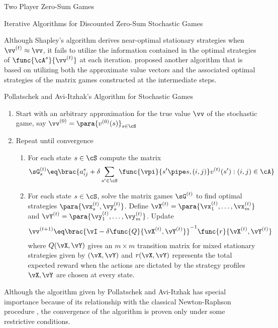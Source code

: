 \documentclass{article}
\begin{document}
\begin{psection}{Two Player Zero-Sum Games}
\begin{psubsection}{Iterative Algorithms for Discounted Zero-Sum Stochastic Games}

		Although Shapley's algorithm derives near-optimal stationary strategies when $\vv^{(t)} \approx \vv$, it fails to utilize the information contained in the optimal strategies of $\func{\cA^s}{\vv^{(t)}}$ at each iteration. \cite{poll-avi} proposed another algorithm that is based on utilizing both the approximate value vectors and the associated optimal strategies of the matrix games constructed at the intermediate steps.

		\begin{algo}[0.9\textwidth]{Pollatschek and Avi-Itzhak's Algorithm for Stochastic Games}
			\begin{enumerate}
				\item Start with an arbitrary approximation for the true value $\vv$ of the stochastic game, say $\vv^{(0)} = \para{v^{(0)}(s)}_{s \in \cS}$
				\item Repeat until convergence
					\begin{enumerate}
						\item For each state $s \in \cS$ compute the matrix
							\begin{align*}
								\sG_s^{(t)} \eq \brac{a^s_{ij} + \delta \sum_{s' \in \cS} \func{\vpi}{s' \pipe s, (i, j)} v^{(t)}(s') : (i, j) \in \cA}
							\end{align*}
						\item For each state $s \in \cS$, solve the matrix games $\sG^{(t)}$ to find optimal strategies $\para{\vx^{(t)}_s, \vy^{(t)}_s}$. Define $\vX^{(t)} = \para{\vx^{(t)}_1, \dots, \vx^{(t)}_m}$ and $\vY^{(t)} = \para{\vy^{(t)}_1, \dots, \vy^{(t)}_m}$. Update
							\begin{align*}
								\vv^{(t+1)} \eq \brac{\vI - \delta \func{Q}{\vX^{(t)}, \vY^{(t)}}}^{-1} \func{r}{\vX^{(t)}, \vY^{(t)}}
							\end{align*}
							where $Q(\vX, \vY)$ gives an $m \times m$ transition matrix for mixed stationary strategies given by $(\vX, \vY)$ and $r(\vX, \vY)$ represents the total expected reward when the actions are dictated by the strategy profiles $\vX, \vY$ are chosen at every state.
					\end{enumerate}
			\end{enumerate}
		\end{algo}

		Although the algorithm given by Pollatschek and Avi-Itzhak has special importance because of its relationship with the classical Newton-Raphson procedure \citep{survey}, the convergence of the algorithm is proven only under some restrictive conditions.


\end{psubsection}
\end{psection}
\end{document}
